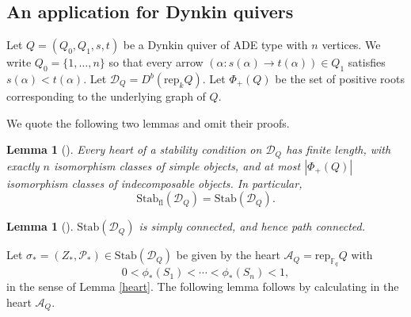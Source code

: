 \documentclass[a4paper,12pt]{amsart}
\numberwithin{equation}{section}
\newtheorem{lemma}[theorem]{Lemma}
\newcommand{\rep}{\mathrm{rep}}
\newcommand{\Stab}{\mathrm{Stab}}
\newcommand{\1}{\mathbf{1}}
\newcommand{\fl}{\mathrm{fl}}
\begin{document}
\subsection{An application for Dynkin quivers}
Let $Q=(Q_0,Q_1,s,t)$ be a Dynkin quiver of ADE type with $n$ vertices. We write $Q_0=\{1,\dots,n\}$ so that every arrow $(\alpha:s(\alpha)\rightarrow t(\alpha))\in Q_1$ satisfies $s(\alpha)<t(\alpha)$. Let $\mathcal{D}_Q=D^b(\rep_kQ)$. Let $\Phi_+(Q)$ be the set of positive roots corresponding to the underlying graph of $Q$.

We quote the following two lemmas and omit their proofs.
\begin{lemma}[{\cite[Lemma 4.11]{QW2018}}]\label{Dynkin length}
Every heart of a stability condition on $\mathcal{D}_Q$ has finite length, with exactly $n$ isomorphism classes of simple objects, and at most $|\Phi_+(Q)|$ isomorphism classes of indecomposable objects. In particular,
\[\Stab_{\fl}(\mathcal{D}_Q)=\Stab(\mathcal{D}_Q).\]
\end{lemma}
\begin{lemma}[{\cite[Theorem 4.7]{Qiu2015}}]
\label{Dynkin path-connectedness}
$\Stab(\mathcal{D}_Q)$ is simply connected, and hence path connected.
\end{lemma}

Let $\sigma_*=(Z_*,\mathcal{P}_*)\in\Stab(\mathcal{D}_Q)$ be given by the heart $\mathcal{A}_Q=\rep_{\mathbb{F}_q}Q$ with
\[0<\phi_*(S_1)<\cdots<\phi_*(S_n)<1,\]
in the sense of Lemma \ref{heart}. The following lemma follows by calculating in the heart $\mathcal{A}_Q$.
\end{document}
